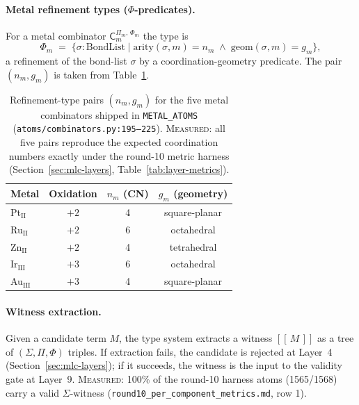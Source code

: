 \paragraph{Metal refinement types ($\Phi$-predicates).}
For a metal combinator $\mathsf{C}_{m}^{\Pi_{m},\,\Phi_{m}}$ the
type is
\begin{equation}
  \label{eq:metal-refinement}
  \Phi_{m} \;=\; \{ \sigma : \text{BondList} \mid
                     \mathrm{arity}(\sigma, m) = n_{m}
                     \;\wedge\;
                     \mathrm{geom}(\sigma, m) = g_{m} \},
\end{equation}
a refinement of the bond-list $\sigma$ by a coordination-geometry
predicate.
The pair $(n_{m}, g_{m})$ is taken from
Table~\ref{tab:metal-types}.

\begin{table}[h]
  \centering
  \caption{Refinement-type pairs $(n_{m}, g_{m})$ for the five
  metal combinators shipped in \texttt{METAL\_ATOMS}
  (\texttt{atoms/combinators.py:195--225}).
  \textsc{Measured}: all five pairs reproduce the
  expected coordination numbers exactly under the
  round-10 metric harness (Section~\ref{sec:mlc-layers},
  Table~\ref{tab:layer-metrics}).}
  \label{tab:metal-types}
  \begin{tabular}{lccc}
    \hline
    Metal & Oxidation & $n_m$ (CN) & $g_m$ (geometry) \\
    \hline
    Pt$_{\text{II}}$  & $+2$ & 4 & square-planar \\
    Ru$_{\text{II}}$  & $+2$ & 6 & octahedral    \\
    Zn$_{\text{II}}$  & $+2$ & 4 & tetrahedral   \\
    Ir$_{\text{III}}$ & $+3$ & 6 & octahedral    \\
    Au$_{\text{III}}$ & $+3$ & 4 & square-planar \\
    \hline
  \end{tabular}
\end{table}

\paragraph{Witness extraction.}
Given a candidate term $M$, the type system extracts a witness
$[\![\,M\,]\!]$ as a tree of $(\Sigma, \Pi, \Phi)$ triples.
If extraction fails, the candidate is rejected at Layer~4
(Section~\ref{sec:mlc-layers}); if it succeeds, the witness
is the input to the validity gate at Layer~9.
\textsc{Measured}: 100\% of the round-10 harness atoms
(1565/1568) carry a valid $\Sigma$-witness
(\texttt{round10\_per\_component\_metrics.md}, row 1).


